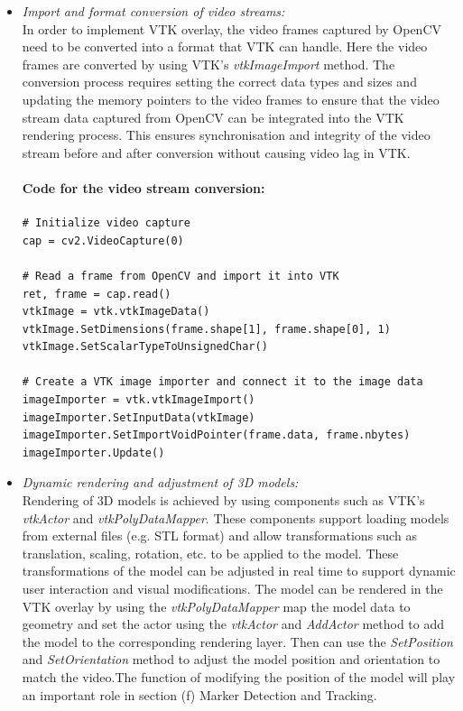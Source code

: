\documentclass[12pt]{article}
\begin{document}
\begin{enumerate}
\begin{enumerate}
\begin{itemize}
                              \item \textit{Import and format conversion of video streams:}
                                    \\
                                    In order to implement VTK overlay, the video frames captured by OpenCV need to be converted into a format that VTK can handle. Here the video frames are converted by using VTK's \emph{vtkImageImport} method. The conversion process requires setting the correct data types and sizes and updating the memory pointers to the video frames to ensure that the video stream data captured from OpenCV can be integrated into the VTK rendering process. This ensures synchronisation and integrity of the video stream before and after conversion without causing video lag in VTK.\cite{vtk_image_import_doc,vtk_image_import_2023}
                                    \paragraph{Code for the video stream conversion:}
                                    \begin{verbatim}
# Initialize video capture
cap = cv2.VideoCapture(0)

# Read a frame from OpenCV and import it into VTK
ret, frame = cap.read()
vtkImage = vtk.vtkImageData()
vtkImage.SetDimensions(frame.shape[1], frame.shape[0], 1)
vtkImage.SetScalarTypeToUnsignedChar()

# Create a VTK image importer and connect it to the image data
imageImporter = vtk.vtkImageImport()
imageImporter.SetInputData(vtkImage)
imageImporter.SetImportVoidPointer(frame.data, frame.nbytes)
imageImporter.Update()
                              \end{verbatim}
                              \item \textit{Dynamic rendering and adjustment of 3D models:}
                                    \\
                                    Rendering of 3D models is achieved by using components such as VTK's \emph{vtkActor} and \emph{vtkPolyDataMapper}. These components support loading models from external files (e.g. STL format) and allow transformations such as translation, scaling, rotation, etc. to be applied to the model. These transformations of the model can be adjusted in real time to support dynamic user interaction and visual modifications\cite{6037214}. The model can be rendered in the VTK overlay by using the \emph{vtkPolyDataMapper} map the model data to geometry and set the actor using the \emph{vtkActor} and \emph{AddActor} method to add the model to the corresponding rendering layer. Then can use the \emph{SetPosition} and \emph{SetOrientation} method to adjust the model position and orientation to match the video\cite{5357714}.The function of modifying the position of the model will play an important role in section (f) Marker Detection and Tracking.

\end{itemize}
\end{enumerate}
\end{enumerate}
\end{document}
